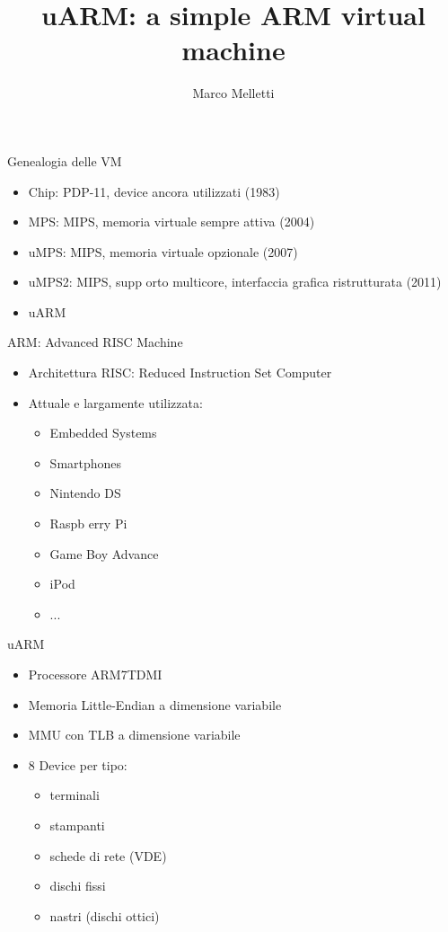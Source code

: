 \documentclass{beamer}
\author{Marco Melletti}
\title{uARM: a simple ARM virtual machine}
\begin{document}
\begin{frame}
        \titlepage
\end{frame}

\begin{frame}{Genealogia delle VM}
\begin{itemize}\itemsep20pt
\item Chip: PDP-11, device ancora utilizzati (1983)
\item MPS: MIPS, memoria virtuale sempre attiva (2004)
\item uMPS: MIPS, memoria virtuale opzionale (2007)
\item uMPS2: MIPS, supp orto multicore, interfaccia grafica ristrutturata (2011)
\item uARM
\end{itemize}
\end{frame}

\begin{frame}{ARM: Advanced RISC Machine}
\begin{itemize}\itemsep20pt
\item Architettura RISC: Reduced Instruction Set Computer
\item Attuale e largamente utilizzata:

	\begin{itemize}\itemsep4pt
	\item Embedded Systems
	\item Smartphones
	\item Nintendo DS
	\item Raspb erry Pi
	\item Game Boy Advance
	\item iPod
	\item ...
	\end{itemize}
\end{itemize}
\end{frame}

\begin{frame}{uARM}
\begin{itemize}\itemsep10pt
\item Processore ARM7TDMI
\item Memoria Little-Endian a dimensione variabile
\item MMU con TLB a dimensione variabile
\item 8 Device per tipo:

	\begin{itemize}\itemsep4pt
	\item terminali
	\item stampanti
	\item schede di rete (VDE)
	\item dischi fissi
	\item nastri (dischi ottici)
	\end{itemize}
\end{itemize}
\end{frame}
\end{document}
